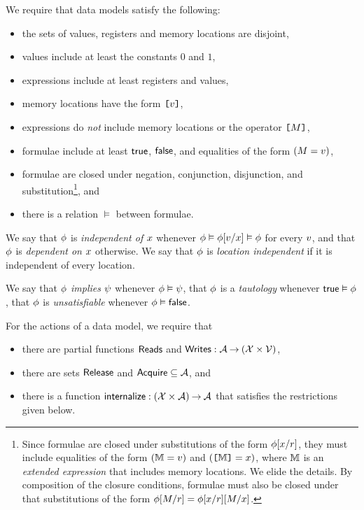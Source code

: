 We require that data models satisfy the following:
\begin{itemize}
\item the sets of values, registers and memory locations are disjoint,
\item values include at least the constants $0$ and $1$,
\item expressions include at least registers and values,
\item memory locations have the form $\texttt{[}v\texttt{]}$,
\item expressions do \emph{not} include memory locations or the operator $\texttt{[}M\texttt{]}$,
\item formulae include at least $\mathsf{true}$, $\mathsf{false}$, and equalities of the form
  $(M=v)$, %
\item formulae are closed under negation, conjunction, disjunction, and
  substitution\footnote{Since formulae are closed under substitutions of the
    form $\phi[x/r]$, they must include equalities of the form
    $(\mathbb{M}=v)$ and $(\texttt{[}\mathbb{M}\texttt{]}=x)$, where $\mathbb{M}$ is an
    \emph{extended expression} that includes memory locations.  We elide the
    details.  By composition of the closure conditions, formulae must also be
    closed under that substitutions of the form
    $\phi[M/r]=\phi[x/r][M/x]$.}, and
\item there is a relation $\vDash$ between formulae.
\end{itemize}

We say that $\phi$ is \emph{independent of $x$} whenever
$\phi \vDash \phi[v/x] \vDash \phi$ for every $v$, and that
$\phi$ is \emph{dependent on $x$} otherwise.  We say that $\phi$ is
\emph{location independent} if it is independent of every location.

We say that $\phi$ \emph{implies} $\psi$ whenever $\phi\vDash\psi$,
that $\phi$ is a \emph{tautology} whenever $\mathsf{true}\vDash\phi$, that
$\phi$ is \emph{unsatisfiable} whenever $\phi\vDash\mathsf{false}$.

For the actions of a data model, we require that
\begin{itemize}
\item there are partial functions $\mathsf{Reads}$ and
  $\mathsf{Writes}: \mathcal{A} \mathbin\rightarrow (\mathcal{X} \times \mathcal{V})$,
\item there are sets $\mathsf{Release}$ and $\mathsf{Acquire} \subseteq\mathcal{A}$, and
\item there is a function $\mathsf{internalize}: (\mathcal{X}\times\mathcal{A}) \mathbin\rightarrow \mathcal{A}$ that
  satisfies the restrictions given below.
\end{itemize}

